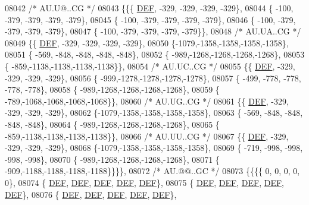 \begin{DoxyCode}
08042 \textcolor{comment}{/* AU.U@..CG */}
08043 \{\{\{  \mbox{\hyperlink{1_88_84__epars_8h_a397419fc12b37ed479c8abb9d444d843}{DEF}}, -329, -329, -329, -329\},
08044 \{ -100, -379, -379, -379, -379\},
08045 \{ -100, -379, -379, -379, -379\},
08046 \{ -100, -379, -379, -379, -379\},
08047 \{ -100, -379, -379, -379, -379\}\},
08048 \textcolor{comment}{/* AU.UA..CG */}
08049 \{\{  \mbox{\hyperlink{1_88_84__epars_8h_a397419fc12b37ed479c8abb9d444d843}{DEF}}, -329, -329, -329, -329\},
08050 \{-1079,-1358,-1358,-1358,-1358\},
08051 \{ -569, -848, -848, -848, -848\},
08052 \{ -989,-1268,-1268,-1268,-1268\},
08053 \{ -859,-1138,-1138,-1138,-1138\}\},
08054 \textcolor{comment}{/* AU.UC..CG */}
08055 \{\{  \mbox{\hyperlink{1_88_84__epars_8h_a397419fc12b37ed479c8abb9d444d843}{DEF}}, -329, -329, -329, -329\},
08056 \{ -999,-1278,-1278,-1278,-1278\},
08057 \{ -499, -778, -778, -778, -778\},
08058 \{ -989,-1268,-1268,-1268,-1268\},
08059 \{ -789,-1068,-1068,-1068,-1068\}\},
08060 \textcolor{comment}{/* AU.UG..CG */}
08061 \{\{  \mbox{\hyperlink{1_88_84__epars_8h_a397419fc12b37ed479c8abb9d444d843}{DEF}}, -329, -329, -329, -329\},
08062 \{-1079,-1358,-1358,-1358,-1358\},
08063 \{ -569, -848, -848, -848, -848\},
08064 \{ -989,-1268,-1268,-1268,-1268\},
08065 \{ -859,-1138,-1138,-1138,-1138\}\},
08066 \textcolor{comment}{/* AU.UU..CG */}
08067 \{\{  \mbox{\hyperlink{1_88_84__epars_8h_a397419fc12b37ed479c8abb9d444d843}{DEF}}, -329, -329, -329, -329\},
08068 \{-1079,-1358,-1358,-1358,-1358\},
08069 \{ -719, -998, -998, -998, -998\},
08070 \{ -989,-1268,-1268,-1268,-1268\},
08071 \{ -909,-1188,-1188,-1188,-1188\}\}\}\},
08072 \textcolor{comment}{/* AU.@@..GC */}
08073 \{\{\{\{    0,    0,    0,    0,    0\},
08074 \{  \mbox{\hyperlink{1_88_84__epars_8h_a397419fc12b37ed479c8abb9d444d843}{DEF}},  \mbox{\hyperlink{1_88_84__epars_8h_a397419fc12b37ed479c8abb9d444d843}{DEF}},  \mbox{\hyperlink{1_88_84__epars_8h_a397419fc12b37ed479c8abb9d444d843}{DEF}},  \mbox{\hyperlink{1_88_84__epars_8h_a397419fc12b37ed479c8abb9d444d843}{DEF}},  \mbox{\hyperlink{1_88_84__epars_8h_a397419fc12b37ed479c8abb9d444d843}{DEF}}\},
08075 \{  \mbox{\hyperlink{1_88_84__epars_8h_a397419fc12b37ed479c8abb9d444d843}{DEF}},  \mbox{\hyperlink{1_88_84__epars_8h_a397419fc12b37ed479c8abb9d444d843}{DEF}},  \mbox{\hyperlink{1_88_84__epars_8h_a397419fc12b37ed479c8abb9d444d843}{DEF}},  \mbox{\hyperlink{1_88_84__epars_8h_a397419fc12b37ed479c8abb9d444d843}{DEF}},  \mbox{\hyperlink{1_88_84__epars_8h_a397419fc12b37ed479c8abb9d444d843}{DEF}}\},
08076 \{  \mbox{\hyperlink{1_88_84__epars_8h_a397419fc12b37ed479c8abb9d444d843}{DEF}},  \mbox{\hyperlink{1_88_84__epars_8h_a397419fc12b37ed479c8abb9d444d843}{DEF}},  \mbox{\hyperlink{1_88_84__epars_8h_a397419fc12b37ed479c8abb9d444d843}{DEF}},  \mbox{\hyperlink{1_88_84__epars_8h_a397419fc12b37ed479c8abb9d444d843}{DEF}},  \mbox{\hyperlink{1_88_84__epars_8h_a397419fc12b37ed479c8abb9d444d843}{DEF}}\},

\end{DoxyCode}
